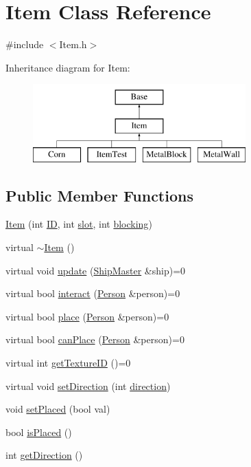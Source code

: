 \hypertarget{classItem}{\section{Item Class Reference}
\label{classItem}
}


{\ttfamily \#include $<$Item.\-h$>$}

Inheritance diagram for Item\-:\begin{figure}[H]
\begin{center}
\leavevmode
\includegraphics[height=3.000000cm]{classItem}
\end{center}
\end{figure}
\subsection*{Public Member Functions}
\begin{DoxyCompactItemize}
\item 
\hyperlink{classItem_aeccb01d448bffa2c4b89a49d4d39ea6f}{Item} (int \hyperlink{classBase_a1dddc037afe2eae3e1364597e6a3cf46}{I\-D}, int \hyperlink{classItem_adcfbfc3a87d2112c62b812dac2c72993}{slot}, int \hyperlink{classItem_a5166900b24ba9e746a7ad34c00353cdd}{blocking})
\item 
virtual \hyperlink{classItem_a33cc9c0bc556b5a33a9d0d58d37c602b}{$\sim$\-Item} ()
\item 
virtual void \hyperlink{classItem_af7cb35b77955c00a38fc0f952da762f4}{update} (\hyperlink{classShipMaster}{Ship\-Master} \&ship)=0
\item 
virtual bool \hyperlink{classItem_a65a4d68109b4aa82c62d262ab4786145}{interact} (\hyperlink{classPerson}{Person} \&person)=0
\item 
virtual bool \hyperlink{classItem_a2fc04b2fdd729977c419e0a1c5c8fa87}{place} (\hyperlink{classPerson}{Person} \&person)=0
\item 
virtual bool \hyperlink{classItem_afa9967b10984b1886ed6097eab7239e3}{can\-Place} (\hyperlink{classPerson}{Person} \&person)=0
\item 
virtual int \hyperlink{classItem_a38889163e99a1f5ec9b811b8e64fbc36}{get\-Texture\-I\-D} ()=0
\item 
virtual void \hyperlink{classItem_aa4aea30738280ffbc897ed3a9b64362a}{set\-Direction} (int \hyperlink{classItem_a1812b51dc93d2142c0641c536fbef617}{direction})
\item 
void \hyperlink{classItem_ab347bc647966f28266a36e3af34c35cc}{set\-Placed} (bool val)
\item 
bool \hyperlink{classItem_aca2ca239027e41044ce015c14c4feff6}{is\-Placed} ()
\item 
int \hyperlink{classItem_a9f232e560cdaec93805b428349477c68}{get\-Direction} ()
\end{DoxyCompactItemize}
